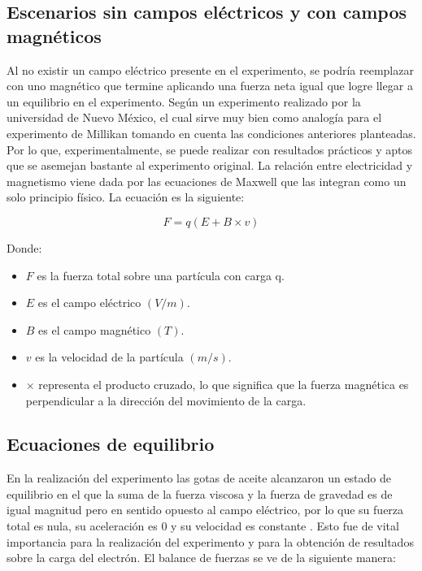 \documentclass[
 reprint,
 amsmath,amssymb,
 aps,
]{revtex4-2}
\begin{document}
\subsection{\label{sec:levels}Escenarios sin campos eléctricos y con campos magnéticos}

Al no existir un campo eléctrico presente en el experimento, se podría reemplazar con uno magnético que termine aplicando una fuerza neta igual que logre llegar a un equilibrio en el experimento. Según un experimento realizado por la universidad de Nuevo México, el cual sirve muy bien como analogía para el experimento de Millikan tomando en cuenta las condiciones anteriores planteadas. Por lo que, experimentalmente, se puede realizar con resultados prácticos y aptos que se asemejan bastante al experimento original.
La relación entre electricidad y magnetismo viene dada por las ecuaciones de Maxwell que las integran como un solo principio físico. La ecuación es la siguiente:

\begin{equation}
    F=q(E+B\times v)    
\end{equation}

Donde:
\begin{itemize}
    \item $F$ es la fuerza total sobre una partícula con carga q.
    \item $E$ es el campo eléctrico $(V/m)$.
    \item $B$ es el campo magnético $(T)$.
    \item $v$ es la velocidad de la partícula $(m/s)$.
    \item $\times$ representa el producto cruzado, lo que significa que la fuerza magnética es perpendicular a la dirección del movimiento de la carga.\cite{pearson1313}
\end{itemize}

\subsection{\label{sec:levels}Ecuaciones de equilibrio}

En la realización del experimento  las gotas de aceite alcanzaron un estado de equilibrio en el que la suma de la fuerza viscosa y la fuerza de gravedad es de igual magnitud pero en sentido opuesto al campo eléctrico, por lo que su fuerza total es nula, su aceleración es 0 y su velocidad es constante \cite{Mera_Ayala_2015}. Esto fue de vital importancia para la realización del experimento y para la obtención de resultados sobre la carga del electrón. El balance de fuerzas se ve de la siguiente manera:
\end{document}
